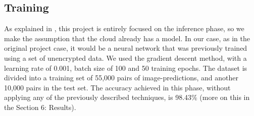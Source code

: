 \subsection{Training}

As explained in \cite{dowlin2016cryptonets}, this project is entirely focused on the inference phase, so we make the assumption that the cloud already has a model. In our case, as in the original project case, it would be a neural network that was previously trained using a set of unencrypted data. We used the gradient descent method, with a learning rate of 0.001, batch size of 100 and 50 training epochs. The dataset is divided into a training set of 55,000 pairs of image-predictions, and another 10,000 pairs in the test set. The accuracy achieved in this phase, without applying any of the previously described techniques, is 98.43\% (more on this in the Section 6: Results).
